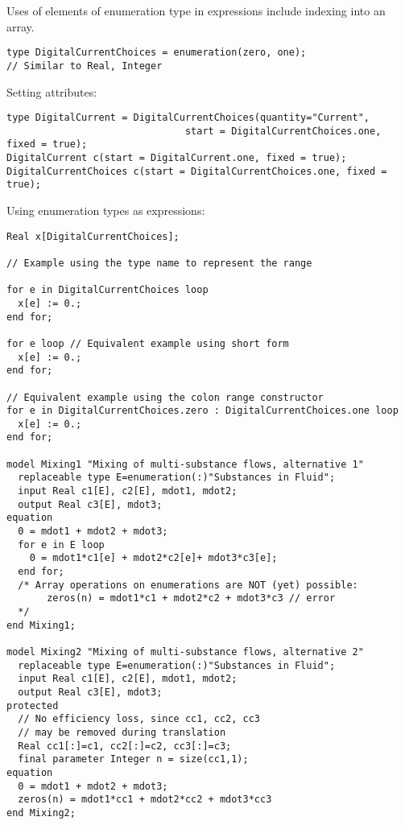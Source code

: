 \begin{nonnormative}
Uses of elements of enumeration type in expressions include indexing into an array.
\end{nonnormative}

\begin{example}
\begin{lstlisting}[language=modelica]
type DigitalCurrentChoices = enumeration(zero, one);
// Similar to Real, Integer
\end{lstlisting}

Setting attributes:
\begin{lstlisting}[language=modelica]
type DigitalCurrent = DigitalCurrentChoices(quantity="Current",
                               start = DigitalCurrentChoices.one, fixed = true);
DigitalCurrent c(start = DigitalCurrent.one, fixed = true);
DigitalCurrentChoices c(start = DigitalCurrentChoices.one, fixed = true);
\end{lstlisting}

Using enumeration types as expressions:
\begin{lstlisting}[language=modelica]
Real x[DigitalCurrentChoices];

// Example using the type name to represent the range

for e in DigitalCurrentChoices loop
  x[e] := 0.;
end for;

for e loop // Equivalent example using short form
  x[e] := 0.;
end for;

// Equivalent example using the colon range constructor
for e in DigitalCurrentChoices.zero : DigitalCurrentChoices.one loop
  x[e] := 0.;
end for;

model Mixing1 "Mixing of multi-substance flows, alternative 1"
  replaceable type E=enumeration(:)"Substances in Fluid";
  input Real c1[E], c2[E], mdot1, mdot2;
  output Real c3[E], mdot3;
equation
  0 = mdot1 + mdot2 + mdot3;
  for e in E loop
    0 = mdot1*c1[e] + mdot2*c2[e]+ mdot3*c3[e];
  end for;
  /* Array operations on enumerations are NOT (yet) possible:
       zeros(n) = mdot1*c1 + mdot2*c2 + mdot3*c3 // error
  */
end Mixing1;

model Mixing2 "Mixing of multi-substance flows, alternative 2"
  replaceable type E=enumeration(:)"Substances in Fluid";
  input Real c1[E], c2[E], mdot1, mdot2;
  output Real c3[E], mdot3;
protected
  // No efficiency loss, since cc1, cc2, cc3
  // may be removed during translation
  Real cc1[:]=c1, cc2[:]=c2, cc3[:]=c3;
  final parameter Integer n = size(cc1,1);
equation
  0 = mdot1 + mdot2 + mdot3;
  zeros(n) = mdot1*cc1 + mdot2*cc2 + mdot3*cc3
end Mixing2;
\end{lstlisting}
\end{example}

